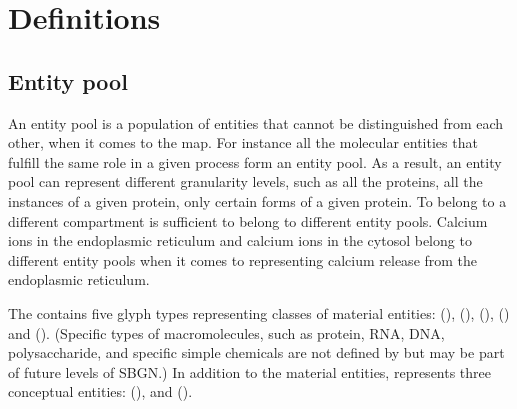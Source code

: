 
\section{Definitions}


\subsection{Entity pool}\label{sec:EPNs}

An entity pool is a population of entities that cannot be distinguished from each other, when it comes to the \SBGNPDLone map. For instance all the molecular  entities that fulfill the same role in a given process form an entity pool. As a result, an entity pool can represent different granularity levels, such as all the proteins, all the instances of a given protein, only certain forms of a given protein. To belong to a different compartment is sufficient to belong to different entity pools. Calcium ions in the endoplasmic reticulum and calcium ions in the cytosol belong to different entity pools when it comes to representing calcium release from the endoplasmic reticulum.

The \PD contains five glyph types representing classes of material
entities:  (),
 (), 
(),  ()
and  ().  (Specific types of
macromolecules, such as protein, RNA, DNA, polysaccharide, and
specific simple chemicals are not defined by \PD but may be part of
future levels of SBGN.)  In addition to the material entities, \PD
represents three conceptual entities: 
(), and  ().

